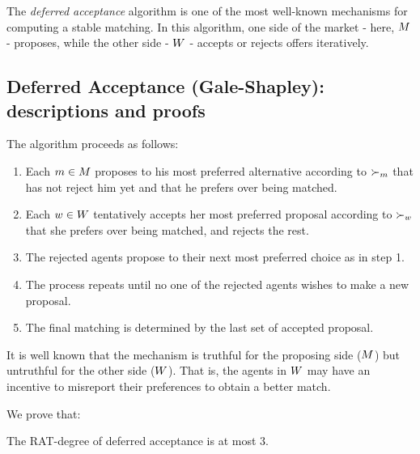 The \emph{deferred acceptance} algorithm \cite{gale1962college} is one of the most well-known mechanisms for computing a stable matching. 
In this algorithm, one side of the market - here, $M$ - proposes, while the other side - $W$ - accepts or rejects offers iteratively. 
%
\begin{toappendix}
\subsection{Deferred Acceptance (Gale-Shapley): descriptions and proofs}
The algorithm proceeds as follows:
\begin{enumerate}
    \item Each $m \in M$ proposes to his most preferred alternative according to $\succ_{m}$ that has not reject him yet and that he prefers over being matched. 

    \item Each $w \in W$ tentatively accepts her most preferred proposal according to $\succ_{w}$ that she prefers over being matched, and rejects the rest.

    \item The rejected agents propose to their next most preferred choice as in step 1.

    \item The process repeats until no one of the rejected agents wishes to make a new proposal.

    \item The final matching is determined by the last set of accepted proposal.
\end{enumerate}



It is well known that the mechanism is truthful for the proposing side ($M$) but untruthful for the other side ($W$).
That is, the agents in $W$ may have an incentive to misreport their preferences to obtain a better match.
\end{toappendix}
%
We prove that: 
 
\begin{theoremrep}\label{prop-def-acc-trunc}
    The RAT-degree of deferred acceptance is at most $3$.
\end{theoremrep}

